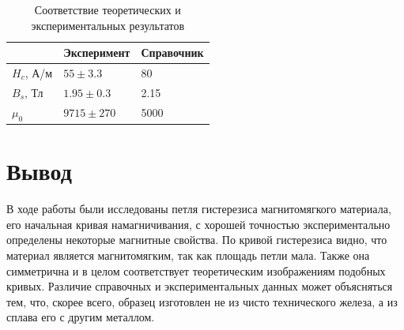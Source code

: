 \documentclass[a4paper]{article}
\begin{document}
\begin{enumerate}
   \begin{table}[h]
    \centering
    \begin{center}
    \caption{Соответствие теоретических и экспериментальных результатов}
    \end{center}
    \vspace{0.1cm}
    \label{tab:my_label}
    \begin{tabular}{ |p{2cm}||p{3cm}|p{3cm}| }
 \hline
     & Эксперимент & Справочник\\
\hline
\hline
     $H_c$, А/м & $55 \pm 3.3$ & 80  \\
\hline
    $B_s$, Тл & $1.95 \pm 0.3$ & 2.15 \\
\hline
    $\mu_0$ & $9715 \pm 270$ & 5000 \\
\hline

    \end{tabular}
\end{table}

\section{Вывод}

В ходе работы были исследованы петля гистерезиса магнитомягкого материала, его начальная кривая намагничивания, с хорошей точностью экспериментально определены некоторые магнитные свойства. По кривой гистерезиса видно, что материал является магнитомягким, так как площадь петли мала. Также она симметрична и в целом соответствует теоретическим изображениям подобных кривых. Различие справочных и экспериментальных данных может объясняться тем, что, скорее всего, образец изготовлен не из чисто технического железа, а из сплава его с другим металлом. 

\end{enumerate}
\end{document}
